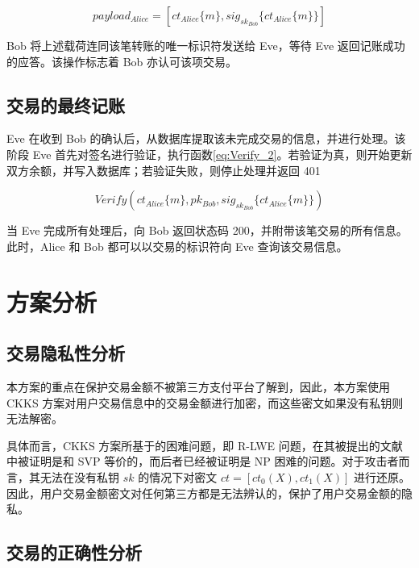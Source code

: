 \begin{equation} \label{eq:Payload_bob}
    payload_{Alice} = [ct_{Alice}\{m\}, sig_{sk_{Bob}}\{ct_{Alice}\{m\}\}]
\end{equation}

Bob 将上述载荷连同该笔转账的唯一标识符发送给 Eve，等待 Eve 返回记账成功的应答。该操作标志着 Bob 亦认可该项交易。

\subsection{交易的最终记账}

Eve 在收到 Bob 的确认后，从数据库提取该未完成交易的信息，并进行处理。该阶段 Eve 首先对签名进行验证，执行函数\eqref{eq:Verify_2}。若验证为真，则开始更新双方余额，并写入数据库；若验证失败，则停止处理并返回 401 

\begin{equation} \label{eq:Verify_2}
    Verify(ct_{Alice}\{m\}, pk_{Bob}, sig_{sk_{Bob}}\{ct_{Alice}\{m\}\})
\end{equation}

当 Eve 完成所有处理后，向 Bob 返回状态码 200，并附带该笔交易的所有信息。此时，Alice 和 Bob 都可以以交易的标识符向 Eve 查询该交易信息。

\section{方案分析}

\subsection{交易隐私性分析}

本方案的重点在保护交易金额不被第三方支付平台了解到，因此，本方案使用 CKKS 方案对用户交易信息中的交易金额进行加密，而这些密文如果没有私钥则无法解密。

具体而言，CKKS 方案所基于的困难问题，即 R-LWE 问题，在其被提出的文献\cite{cryptoeprint:2012/230}中被证明是和 SVP 等价的，而后者已经被证明是 NP 困难的问题\cite{10.1145/276698.276705}。对于攻击者而言，其无法在没有私钥 $sk$ 的情况下对密文 $ct = [ct_0(X), ct_1(X)]$ 进行还原。因此，用户交易金额密文对任何第三方都是无法辨认的，保护了用户交易金额的隐私。

\subsection{交易的正确性分析}

